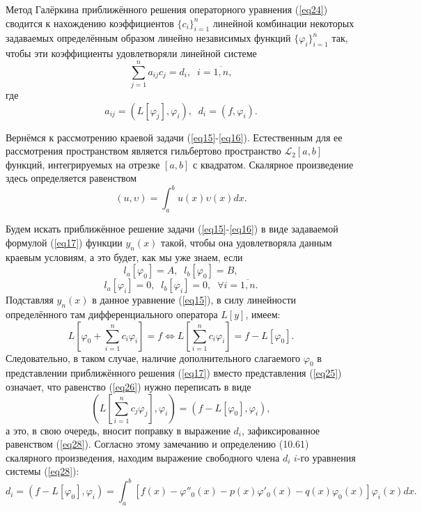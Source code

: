 \documentclass[
11pt,
master, %
subf, %
href, %
colorlinks=true, %
times, %
]{disser}
\begin{document}
Метод Галёркина приближённого решения операторного уравнения (\ref{eq24}) сводится к нахождению коэффициентов $\{c_i\}_{i=1}^n$ линейной комбинации некоторых задаваемых определённым образом линейно независимых функций $\{\varphi_i\}_{i=1}^n$ так, чтобы эти коэффициенты удовлетворяли линейной системе
\begin{equation}\label{eq27}
\sum_{j=1}^{n} a_{ij}c_j = d_i, \;\; i = \overline{1,n},
\end{equation}
где
\begin{equation}\label{eq28}
a_{ij} = (L[\varphi_j], \varphi_i), \;\; d_i = (f, \varphi_i).
\end{equation}

Вернёмся к рассмотрению краевой задачи (\ref{eq15}-\ref{eq16}). Естественным для ее рассмотрения пространством является гильбертово пространство $\mathcal{L}_2[a, b]$ функций, интегрируемых на отрезке $[a,b]$ с квадратом. Скалярное произведение здесь определяется равенством
\begin{equation}\label{eq29}
(u,\upsilon) = \int_{a}^{b} u(x) \upsilon(x) dx.
\end{equation}

Будем искать приближённое решение задачи (\ref{eq15}-\ref{eq16}) в виде задаваемой формулой (\ref{eq17}) функции $y_n(x)$ такой, чтобы она удовлетворяла данным краевым условиям, а это будет, как мы уже знаем, если
$$l_a[\varphi_0] = A, \;\; l_b[\varphi_0] = B,$$
$$l_a[\varphi_i] = 0, \;\; l_b[\varphi_i] = 0, \;\; \forall i = \overline{1,n}.$$
Подставляя $y_n(x)$ в данное уравнение (\ref{eq15}), в силу линейности определённого там дифференциального оператора $L[y]$, имеем:
$$L\left[\varphi_0 + \sum_{i=1}^{n} c_i \varphi_i\right] = f \Leftrightarrow L\left[\sum_{i=1}^{n} c_i \varphi_i\right] = f - L[\varphi_0].$$
Следовательно, в таком случае, наличие дополнительного слагаемого $\varphi_0$ в представлении приближённого решения (\ref{eq17}) вместо представления (\ref{eq25}) означает, что равенство (\ref{eq26}) нужно переписать в виде
$$\left(L\left[\sum_{i=1}^{n} c_j \varphi_j\right], \varphi_i\right) = (f - L[\varphi_0], \varphi_i),$$
а это, в свою очередь, вносит поправку в выражение $d_i$, зафиксированное равенством (\ref{eq28}). Согласно этому замечанию и определению (10.61) скалярного произведения, находим выражение свободного члена $d_i$ $i$-го уравнения системы (\ref{eq28}):
\begin{equation}\label{eq30}
d_i = (f - L[\varphi_0], \varphi_i) = \int_{a}^{b}[f(x) - \varphi''_0(x) - p(x)\varphi'_0(x) - q(x)\varphi_0(x)] \varphi_i(x) dx.
\end{equation}
\end{document}
